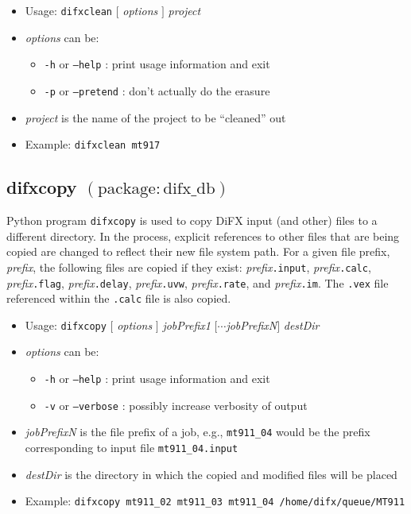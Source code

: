 \begin{itemize}
\item[] Usage: {\tt difxclean} $[$ {\em options} $]$ {\em project}
\item[] {\em options} can be:
\begin{itemize}
\item[] {\tt -h} or {\tt --help} : print usage information and exit
\item[] {\tt -p} or {\tt --pretend} : don't actually do the erasure
\end{itemize}
\item[] {\em project} is the name of the project to be ``cleaned'' out
\item[] Example: {\tt difxclean mt917}
\end{itemize}









\subsection{difxcopy {\small $\mathrm{(package: difx\_db)}$}} \label{sec:difxcopy}

Python program {\tt difxcopy} is used to copy DiFX input (and other) files to a different directory.
In the process, explicit references to other files that are being copied are changed to reflect their
new file system path.
For a given file prefix, {\em prefix}, the following files are copied if they exist: {\em prefix}{\tt .input}, {\em prefix}{\tt .calc}, {\em prefix}{\tt .flag}, {\em prefix}{\tt .delay}, {\em prefix}{\tt .uvw}, {\em prefix}{\tt .rate}, and {\em prefix}{\tt .im}.
The {\tt .vex} file referenced within the {\tt .calc} file is also copied.

\begin{itemize}
\item[] Usage: {\tt difxcopy} $[$ {\em options} $]$ {\em jobPrefix1} $[\cdots${\em jobPrefixN}$]$ {\em destDir}
\item[] {\em options} can be:
\begin{itemize}
\item[] {\tt -h} or {\tt --help} : print usage information and exit
\item[] {\tt -v} or {\tt --verbose} : possibly increase verbosity of output
\end{itemize}
\item[] {\em jobPrefixN} is the file prefix of a job, e.g., {\tt mt911\_04} would be the prefix corresponding to input file {\tt mt911\_04.input}
\item[] {\em destDir} is the directory in which the copied and modified files will be placed
\item[] Example: {\tt difxcopy mt911\_02 mt911\_03 mt911\_04 /home/difx/queue/MT911}
\end{itemize}










